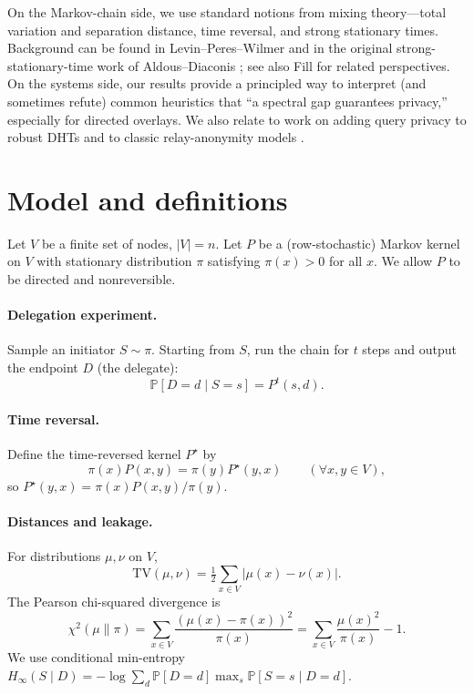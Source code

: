 \documentclass[11pt]{article}
\newcommand{\TV}{\mathrm{TV}}
\newcommand{\Prb}{\mathbb{P}}
\begin{document}
On the Markov-chain side, we use standard notions from mixing theory---total
variation and separation distance, time reversal, and strong stationary times.
Background can be found in Levin--Peres--Wilmer \cite{lpw} and in the original
strong-stationary-time work of Aldous--Diaconis \cite{aldousdiaconis}; see also
Fill \cite{fill} for related perspectives. On the systems side, our results
provide a principled way to interpret (and sometimes refute) common heuristics
that ``a spectral gap guarantees privacy,'' especially for directed overlays.
We also relate to work on adding query privacy to robust DHTs \cite{backes} and
to classic relay-anonymity models \cite{reiterrubin}.

\section{Model and definitions}\label{sec:model}
Let $V$ be a finite set of nodes, $|V|=n$. Let $P$ be a (row-stochastic) Markov
kernel on $V$ with stationary distribution $\pi$ satisfying $\pi(x)>0$ for all
$x$. We allow $P$ to be directed and nonreversible.

\paragraph{Delegation experiment.}
Sample an initiator $S\sim \pi$. Starting from $S$, run the chain for $t$ steps
and output the endpoint $D$ (the delegate):
\[
\Prb[D=d\mid S=s] = P^t(s,d).
\]

\paragraph{Time reversal.}
Define the time-reversed kernel $P^\star$ by
\begin{equation}\label{eq:rev}
\pi(x)P(x,y)=\pi(y)P^\star(y,x)\qquad(\forall x,y\in V),
\end{equation}
so $P^\star(y,x)=\pi(x)P(x,y)/\pi(y)$.

\paragraph{Distances and leakage.}
For distributions $\mu,\nu$ on $V$,
\[
\TV(\mu,\nu)=\tfrac12\sum_{x\in V}|\mu(x)-\nu(x)|.
\]
The Pearson chi-squared divergence is
\[
\chi^2(\mu\|\pi)=\sum_{x\in V}\frac{(\mu(x)-\pi(x))^2}{\pi(x)}
=\sum_{x\in V}\frac{\mu(x)^2}{\pi(x)}-1.
\]
We use conditional min-entropy
$H_\infty(S\mid D)= -\log \sum_d \Prb[D=d]\max_s \Prb[S=s\mid D=d]$.
\end{document}
